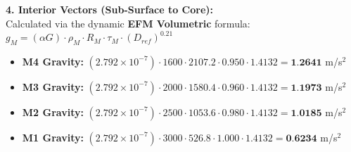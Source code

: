 \documentclass[11pt, a4paper]{article}
\begin{document}
  \vspace{0.5em}
  \noindent \textbf{4. Interior Vectors (Sub-Surface to Core):} \\[0.5em]
  \hspace*{1em} Calculated via the dynamic \textbf{EFM Volumetric} formula: $g_M = (\alpha G) \cdot \rho_{M} \cdot R_M \cdot \tau_M \cdot (D_{ref})^{0.21}$
  \begin{itemize}
    \item \textbf{M4 Gravity:} $(2.792 \times 10^{-7}) \cdot 1600 \cdot 2107.2 \cdot 0.950 \cdot 1.4132 = \textbf{1.2641}$ m/s$^2$
    \item \textbf{M3 Gravity:} $(2.792 \times 10^{-7}) \cdot 2000 \cdot 1580.4 \cdot 0.960 \cdot 1.4132 = \textbf{1.1973}$ m/s$^2$
    \item \textbf{M2 Gravity:} $(2.792 \times 10^{-7}) \cdot 2500 \cdot 1053.6 \cdot 0.980 \cdot 1.4132 = \textbf{1.0185}$ m/s$^2$
    \item \textbf{M1 Gravity:} $(2.792 \times 10^{-7}) \cdot 3000 \cdot 526.8 \cdot 1.000 \cdot 1.4132 = \textbf{0.6234}$ m/s$^2$
  \end{itemize}
\end{document}
